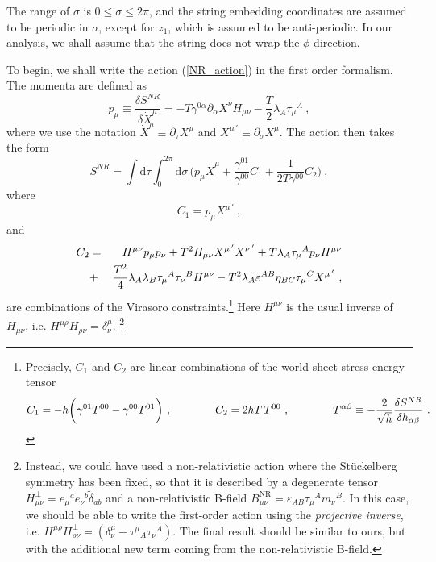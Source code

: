 \documentclass[12pt]{article}
\def\dd{\text{d}}
\numberwithin{equation}{section}
\begin{document}
 

The range of $\sigma$ is $0\leq \sigma\leq 2\pi$, and the string embedding coordinates are assumed to be periodic in $\sigma$, except for $z_1$, which is assumed to be anti-periodic.   In our analysis, we shall assume that the string does not wrap the $\phi$-direction.

To begin, we shall write the action (\ref{NR_action}) in the first order formalism. The momenta are defined as 
\begin{equation}
\label{def_momenta}
p_{\mu} \equiv \frac{\delta S^{NR}}{\delta \dot{X}^{\mu}} = - T \gamma^{0\alpha} \partial_{\alpha} X^{\nu} H_{\mu\nu} - \frac{T}{2} \lambda_A \tau_{\mu}{}^A \ , 
\end{equation}
where we use the notation $\dot{X}^{\mu} \equiv \partial_{\tau} X^{\mu}$ and $X^{\mu \, '} \equiv \partial_{\sigma} X^{\mu}$. The action then takes the form
\begin{equation}
\label{first_NR_action}
S^{NR} = \int \dd \tau \int_0^{2 \pi} \dd \sigma \, \bigg( p_{\mu} \dot{X}^{\mu} + \frac{\gamma^{01}}{\gamma^{00}} C_1 + \frac{1}{2 T \gamma^{00}} C_2 \bigg) \ , 
\end{equation}
where
\begin{equation}
C_1 = p_{\mu} X^{\mu \, '} \ , 
\end{equation}
and 
\begin{eqnarray}
\notag
C_2 &=& H^{\mu\nu} p_{\mu}p_{\nu} + T^2 H_{\mu\nu} X^{\mu \, '}X^{\nu \, '} + T \lambda_A \tau_{\mu}{}^A p_{\nu} H^{\mu\nu} \\
&+& \frac{T^2}{4} \lambda_A \lambda_B \tau_{\mu}{}^A \tau_{\nu}{}^B H^{\mu\nu}
- T^2 \lambda_A \varepsilon^{AB} \eta_{BC} \tau_{\mu}{}^C X^{\mu \, '} \ ,
\end{eqnarray}
are combinations of the Virasoro constraints.\footnote{Precisely, $C_1$ and $C_2$ are linear combinations of the world-sheet stress-energy tensor
\begin{equation}
\notag
C_1 =- h \bigg(  \gamma^{01} T^{00} - \gamma^{00} T^{01} \bigg) \ , \qquad\qquad
C_2 = 2 h T\,  T^{00} \ , \qquad\qquad  T^{\alpha\beta} \equiv - \frac{2}{\sqrt{h}} \frac{\delta S^{NR}}{\delta h_{\alpha\beta}}\ .
\end{equation}}
Here $H^{\mu\nu}$ is the usual inverse of $H_{\mu\nu}$, i.e. $H^{\mu\rho}H_{\rho \nu}=\delta^\mu_\nu$.
\footnote{Instead, we could have used a non-relativistic action where the St\"uckelberg symmetry has been fixed, so that it is described by a degenerate tensor $H^{\perp}_{\mu\nu} = e_{\mu}{}^a e_{\nu}{}^b \tilde{\delta}_{ab}$ and a non-relativistic B-field $B^{\text{NR}}_{\mu\nu} = \varepsilon_{AB} \tau_{\mu}{}^A m_{\nu}{}^B$. In this case, we should be able to write the first-order action using the \emph{projective inverse}, i.e. $H^{\mu\rho}H^{\perp}_{\rho \nu}= (\delta^\mu_\nu - \tau^{\mu}{}_A \tau_{\nu}{}^A)$. The final result should be similar to ours, but with the additional new term coming from the non-relativistic B-field.}  
\end{document}
